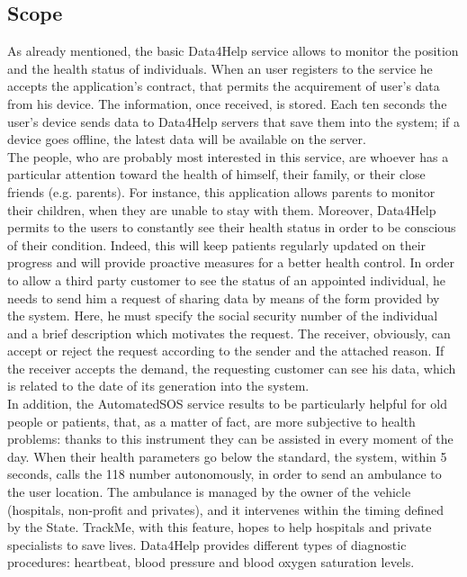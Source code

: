 \subsection{Scope}
As already mentioned, the basic Data4Help service allows to monitor the position and the health status of individuals. When an user registers to the service he accepts the application's contract, that permits the acquirement of user's data from his device. The information, once received, is stored. 
Each ten seconds the user's device sends data to Data4Help servers that save them into the system; if a device goes offline, the latest data will be available on the server.\\ 
The people, who are probably most interested in this service, are whoever has a particular attention toward the health of himself, their family, or their close friends (e.g. parents).
For instance, this application allows parents to monitor their children, when they are unable to stay with them. 
Moreover, Data4Help permits to the users to constantly see their health status in order to be conscious of their condition. Indeed, this will keep patients regularly updated on their progress and will provide proactive measures for a better health control. 
In order to allow a third party customer to see the status of an appointed individual, he needs to send him a request of sharing data by means of the form provided by the system. 
Here, he must specify the social security number of the individual and a brief description which motivates the request. 
The receiver, obviously, can accept or reject the request according to the sender and the attached reason. 
If the receiver accepts the demand, the requesting customer can see his data, which is related to the date of its generation into the system. \\ 
In addition, the AutomatedSOS service results to be particularly helpful for old people or patients, that, as a matter of fact, are more subjective to health problems: thanks to this instrument they can be assisted in every moment of the day. 
When their health parameters go below the standard, the system, within 5 seconds, calls the 118 number autonomously, in order to send an ambulance to the user location. 
The ambulance is managed by the owner of the vehicle (hospitals, non-profit and privates), and it intervenes within the timing defined by the State.
TrackMe, with this feature, hopes to help hospitals and private specialists to save lives.
Data4Help provides different types of diagnostic procedures:  heartbeat, blood pressure and blood oxygen saturation levels.\\ 
